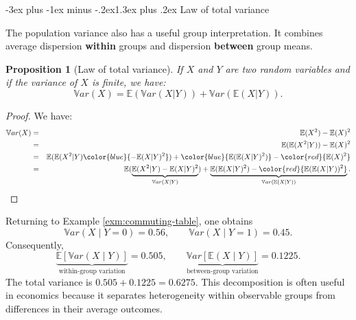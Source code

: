 \documentclass[
  11pt,
]{book}
\makeatletter
\renewcommand\section{\@startsection{section}{1}{\z@}
  {-3ex plus -1ex minus -.2ex}{1.3ex plus .2ex}
  {\normalfont\Large\bfseries\color{TextbookInk}}}
\newtheorem{proposition}{Proposition}[chapter]
\theoremstyle{definition}
\theoremstyle{definition}
\theoremstyle{definition}
\theoremstyle{definition}
\theoremstyle{remark}
\makeatother
\begin{document}
\section{Law of total variance}\label{basics-total-variance}

The population variance also has a useful group interpretation. It combines average dispersion \textbf{within} groups and dispersion \textbf{between} group means.

\begin{proposition}[Law of total variance]
\protect\hypertarget{prp:lawtotalvariance}{}\label{prp:lawtotalvariance}If \(X\) and \(Y\) are two random variables and if the variance of \(X\) is finite, we have:
\[
\boxed{\mathbb{V}ar(X) = \mathbb{E}(\mathbb{V}ar(X|Y)) + \mathbb{V}ar(\mathbb{E}(X|Y)).}
\]
\end{proposition}

\begin{proof}
We have:
\begin{eqnarray*}
\mathbb{V}ar(X) &=& \mathbb{E}(X^2) - \mathbb{E}(X)^2\\
&=& \mathbb{E}(\mathbb{E}(X^2|Y)) - \mathbb{E}(X)^2\\
&=& \mathbb{E}(\mathbb{E}(X^2|Y) \color{blue}{- \mathbb{E}(X|Y)^2}) +  \color{blue}{\mathbb{E}(\mathbb{E}(X|Y)^2)}  - \color{red}{\mathbb{E}(X)^2}\\
&=& \mathbb{E}(\underbrace{\mathbb{E}(X^2|Y) - \mathbb{E}(X|Y)^2}_{\mathbb{V}ar(X|Y)}) + \underbrace{\mathbb{E}(\mathbb{E}(X|Y)^2) - \color{red}{\mathbb{E}(\mathbb{E}(X|Y))^2}}_{\mathbb{V}ar(\mathbb{E}(X|Y))}.
\end{eqnarray*}
\end{proof}

Returning to Example \ref{exm:commuting-table}, one obtains
\[
\mathbb{V}ar(X\mid Y=0)=0.56,\qquad
\mathbb{V}ar(X\mid Y=1)=0.45.
\]
Consequently,
\[
\underbrace{\mathbb{E}[\mathbb{V}ar(X\mid Y)]}_{\text{within-group variation}}
=0.505,
\qquad
\underbrace{\mathbb{V}ar[\mathbb{E}(X\mid Y)]}_{\text{between-group variation}}
=0.1225.
\]
The total variance is \(0.505+0.1225=0.6275\). This decomposition is often useful in economics because it separates heterogeneity within observable groups from differences in their average outcomes.
\end{document}
